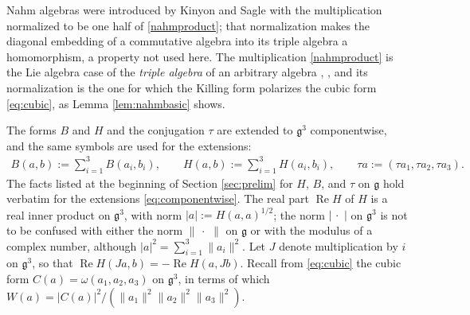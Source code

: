 \documentclass[leqno,10pt]{amsart}
\theoremstyle{definition}
\numberwithin{equation}{section}
\newcommand{\om}{\omega}
\newcommand{\dum}{\,\cdot\,\,}
\newcommand{\re}{\operatorname{Re}}
\newcommand{\g}{\mathfrak{g}}
\newcommand{\norm}[1]{\lVert #1\rVert}
\newcommand{\nnorm}[1]{\lvert #1\rvert}%
\begin{document}
Nahm algebras were introduced by Kinyon and Sagle \cite{Kinyon-Sagle} with the multiplication normalized to be one half of \eqref{nahmproduct}; that normalization makes the diagonal embedding of a commutative algebra into its triple algebra a homomorphism, a property not used here. The multiplication \eqref{nahmproduct} is the Lie algebra case of the \emph{triple algebra} of an arbitrary algebra \cite[Section~11]{Fox-trace}, \cite{Fox-cubicpoly, Fox-Tkachev}, and its normalization is the one for which the Killing form polarizes the cubic form \eqref{eq:cubic}, as Lemma \ref{lem:nahmbasic} shows.

The forms $B$ and $H$ and the conjugation $\tau$ are extended to $\g^{3}$ componentwise, and the same symbols are used for the extensions:
\begin{align}\label{eq:componentwise}
B(a,b):=\sum_{i=1}^3B(a_i,b_i), \qquad H(a,b):=\sum_{i=1}^3H(a_i,b_i), \qquad \tau a:=(\tau a_1,\tau a_2,\tau a_3).
\end{align}
The facts listed at the beginning of Section \ref{sec:prelim} for $H$, $B$, and $\tau$ on $\g$ hold verbatim for the extensions \eqref{eq:componentwise}. 
The real part $\re H$ of $H$ is a real inner product on $\g^{3}$, with norm $\nnorm{a}:=H(a,a)^{1/2}$; the norm $\nnorm{\dum}$ on $\g^{3}$ is not to be confused with either the norm $\norm{\dum}$ on $\g$ or with the modulus of a complex number, although $\nnorm{a}^{2} = \sum_{i=1}^{3}\norm{a_{i}}^{2}$. Let $J$ denote multiplication by $i$ on $\g^{3}$, so that $\re H(Ja, b) = -\re H(a, Jb)$. Recall from \eqref{eq:cubic} the cubic form $C(a) = \om(a_{1}, a_{2}, a_{3})$ on $\g^{3}$, in terms of which $W(a) = |C(a)|^{2}/(\norm{a_{1}}^{2}\norm{a_{2}}^{2}\norm{a_{3}}^{2})$.
\end{document}
